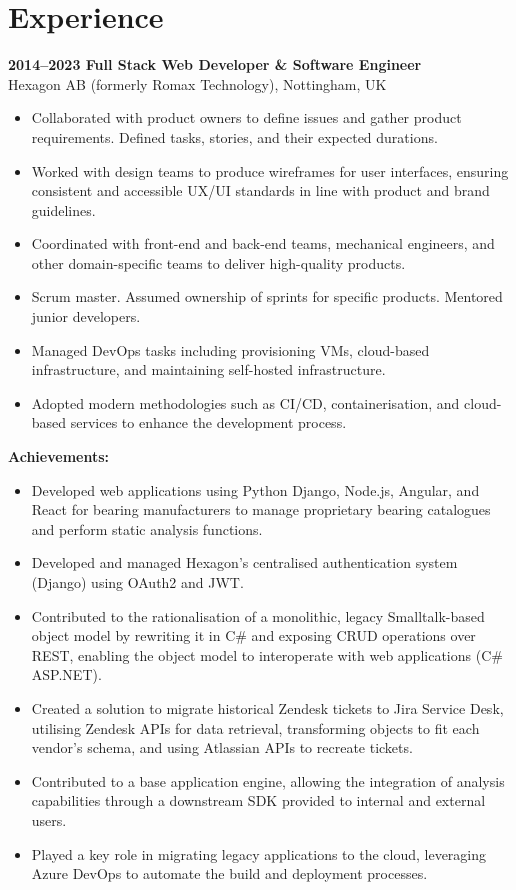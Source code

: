 \documentclass{article}
\begin{document}
\section*{Experience}

\textbf{2014–2023 Full Stack Web Developer \& Software Engineer} \\
Hexagon AB (formerly Romax Technology), Nottingham, UK
\begin{itemize}
    \item Collaborated with product owners to define issues and gather product requirements. Defined tasks, stories, and their expected durations.
    \item Worked with design teams to produce wireframes for user interfaces, ensuring consistent and accessible UX/UI standards in line with product and brand guidelines.
    \item Coordinated with front-end and back-end teams, mechanical engineers, and other domain-specific teams to deliver high-quality products.
    \item Scrum master. Assumed ownership of sprints for specific products. Mentored junior developers.
    \item Managed DevOps tasks including provisioning VMs, cloud-based infrastructure, and maintaining self-hosted infrastructure.
    \item Adopted modern methodologies such as CI/CD, containerisation, and cloud-based services to enhance the development process.
\end{itemize}

\textbf{Achievements:}
\begin{itemize}
    \item Developed web applications using Python Django, Node.js, Angular, and React for bearing manufacturers to manage proprietary bearing catalogues and perform static analysis functions.
    \item Developed and managed Hexagon’s centralised authentication system (Django) using OAuth2 and JWT.
    \item Contributed to the rationalisation of a monolithic, legacy Smalltalk-based object model by rewriting it in C\# and exposing CRUD operations over REST, enabling the object model to interoperate with web applications (C\# ASP.NET).
    \item Created a solution to migrate historical Zendesk tickets to Jira Service Desk, utilising Zendesk APIs for data retrieval, transforming objects to fit each vendor’s schema, and using Atlassian APIs to recreate tickets.
    \item Contributed to a base application engine, allowing the integration of analysis capabilities through a downstream SDK provided to internal and external users.
    \item Played a key role in migrating legacy applications to the cloud, leveraging Azure DevOps to automate the build and deployment processes.
\end{itemize}
\end{document}
